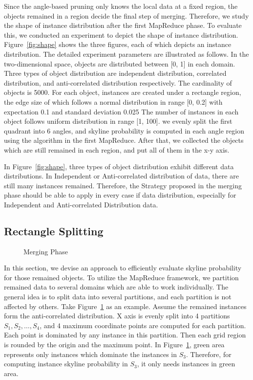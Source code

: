 Since the angle-based pruning only knows the local data at a fixed region, the objects remained in a region decide the final step of merging. Therefore, we study the shape of instance distribution after the first MapReduce phase. To evaluate this, we conducted an experiment to depict the shape of instance distribution. Figure~\ref{fig:shape} shows the three figures, each of which depicts an instance distribution. The detailed experiment parameters are illustrated as follows. In the two-dimensional space, objects are distributed between [0, 1] in each domain. Three types of object distribution are independent distribution, correlated distribution, and anti-correlated distribution respectively. The cardinality of objects is 5000. For each object, instances are created under a rectangle region, the edge size of which follows a normal distribution in range [0, 0.2] with expectation 0.1 and standard deviation 0.025
The number of instances in each object follows uniform distribution in range [1, 100]. we evenly split the first quadrant into 6 angles, and skyline probability is computed in each angle region using the algorithm in the first MapReduce. After that, we collected the objects which are still remained in each region, and put all of them in the x-y axis.

In Figure~\ref{fig:shape}, three types of object distribution exhibit different data distributions. In Independent or Anti-correlated distribution of data, there are still many instances remained. Therefore, the Strategy proposed in the merging phase should be able to apply in every case if data distribution, especially for Independent and Anti-correlated Distribution data.

\subsection{Rectangle Splitting}
\begin{figure}[t]
\vspace{-15pt}
\centering
  \centerline{}
  \caption{Merging Phase}
  \vspace{-15pt}
  \label{figure:gridMerge}
\end{figure}

In this section, we devise an approach to efficiently evaluate skyline probability for those remained objects. To utilize the MapReduce framework, we partition remained data to several domains which are able to work individually. The general idea is to split data into several partitions, and each partition is not affected by others. Take Figure~\ref{figure:gridMerge} as an example. Assume the remained instances form the anti-correlated distribution. X axis is evenly split into 4 partitions $S_1, S_2, \dots, S_4$, and 4 maximum coordinate points are computed for each partition. Each point is dominated by any instance in this partition. Then each grid region is rounded by the origin and the maximum point. In Figure~\ref{figure:gridMerge}, green area represents only instances which dominate the instances in $S_3$. Therefore, for computing instance skyline probability in $S_3$, it only needs instances in green area.

